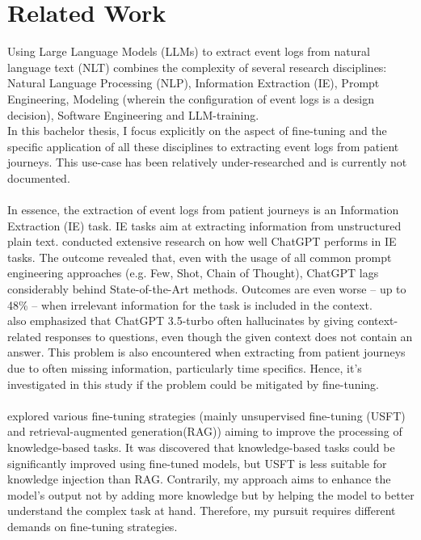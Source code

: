 \section{Related Work}
\label{related_work}
Using Large Language Models (LLMs) to extract event logs from natural language text (NLT) combines the complexity of several research disciplines: Natural Language Processing (NLP), Information Extraction (IE), Prompt Engineering, Modeling (wherein the configuration of event logs is a design decision), Software Engineering and LLM-training.\\
In this bachelor thesis, I focus explicitly on the aspect of fine-tuning and the specific application of all these disciplines to extracting event logs from patient journeys. This use-case has been relatively under-researched and is currently not documented.\\\\
In essence, the extraction of event logs from patient journeys is an Information Extraction (IE) task. IE tasks aim at extracting information from unstructured plain text. \cite{han_is_2023} conducted extensive research on how well ChatGPT performs in IE tasks. The outcome revealed that, even with the usage of all common prompt engineering approaches (e.g. Few, Shot, Chain of Thought), ChatGPT lags considerably behind State-of-the-Art methods. Outcomes are even worse – up to 48\% – when irrelevant information for the task is included in the context.\\
\cite{bahak_evaluating_2023} also emphasized that ChatGPT 3.5-turbo often hallucinates by giving context-related responses to questions, even though the given context does not contain an answer. This problem is also encountered when extracting from patient journeys due to often missing information, particularly time specifics. Hence, it's investigated in this study if the problem could be mitigated by fine-tuning.\\\\
\cite{ovadia_fine-tuning_2024} explored various fine-tuning strategies (mainly unsupervised fine-tuning (USFT) and retrieval-augmented generation(RAG)) aiming to improve the processing of knowledge-based tasks. It was discovered that knowledge-based tasks could be significantly improved using fine-tuned models, but USFT is less suitable for knowledge injection than RAG. Contrarily, my approach aims to enhance the model's output not by adding more knowledge but by helping the model to better understand the complex task at hand. Therefore, my pursuit requires different demands on fine-tuning strategies.\\\\

